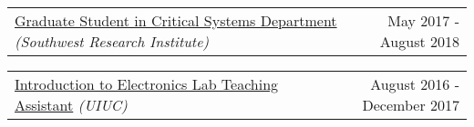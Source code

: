 \documentclass[10pt, letterpaper]{article}
\makeatletter
\newcommand{\headerrow}[2]
{\begin{tabular*}{\linewidth}{l@{\extracolsep{\fill}}r}
	#1 &
	#2 \\
\end{tabular*}}
\makeatother
\begin{document}
\headerrow
	{\uline{Graduate Student in Critical Systems Department} \textit{(Southwest Research Institute)}}
	{May 2017 - August 2018}
	\begin{comment}
	\begin{itemize}%
		\item[] Summer 2017
			\begin{itemize}
				\item Trained and tested convolutional neural networks for methane leak detection and segmentation to be implemented on an NVIDIA Tegra embedded platform
				\item Implemented a parallelized data simulator from MATLAB code in Python to generate training and testing datasets
				\item Trained several shallow, efficient networks for preliminary investigation for an internal research project
			\end{itemize}
		\item[] Summer 2018
			\begin{itemize} 
				\item Investigated the use of computer vision features with convolutional neural networks for gas leak flow rate quantification
				\item Developed algorithms for predicting anomalous events in high dimensional, multi-sensor time series data 
			\end{itemize}
	\end{itemize}
	\end{comment}
	\newline

\headerrow
	{\uline{Introduction to Electronics Lab Teaching Assistant} \textit{(UIUC)}}
	{August 2016 - December 2017}
	\begin{comment}
	\begin{itemize}
		\item Led basic electronics lab sessions weekly and graded lab reports weekly
	\end{itemize}
	\end{comment}
\end{document}
